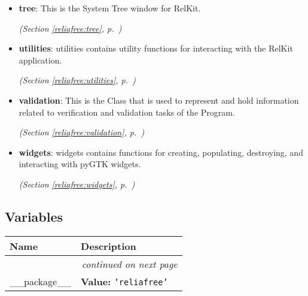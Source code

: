 \begin{itemize}
\begin{itemize}
  \end{itemize}
\item \textbf{tree}: This is the System Tree window for RelKit.



  \textit{(Section \ref{reliafree:tree}, p.~\pageref{reliafree:tree})}

\item \textbf{utilities}: utilities contains utility functions for interacting with the RelKit 
application.



  \textit{(Section \ref{reliafree:utilities}, p.~\pageref{reliafree:utilities})}

\item \textbf{validation}: This is the Class that is used to represent and hold information related to
verification and validation tasks of the Program.



  \textit{(Section \ref{reliafree:validation}, p.~\pageref{reliafree:validation})}

\item \textbf{widgets}: widgets contains functions for creating, populating, destroying, and 
interacting with pyGTK widgets.



  \textit{(Section \ref{reliafree:widgets}, p.~\pageref{reliafree:widgets})}

\end{itemize}



  \subsection{Variables}

    \vspace{-1cm}
\hspace{\varindent}\begin{longtable}{|p{\varnamewidth}|p{\vardescrwidth}|l}
\cline{1-2}
\cline{1-2} \centering \textbf{Name} & \centering \textbf{Description}& \\
\cline{1-2}
\endhead\cline{1-2}\multicolumn{3}{r}{\small\textit{continued on next page}}\\\endfoot\cline{1-2}
\endlastfoot\raggedright \_\-\_\-p\-a\-c\-k\-a\-g\-e\-\_\-\_\- & \raggedright \textbf{Value:} 
{\tt \texttt{'}\texttt{reliafree}\texttt{'}}&\\
\cline{1-2}
\end{longtable}

